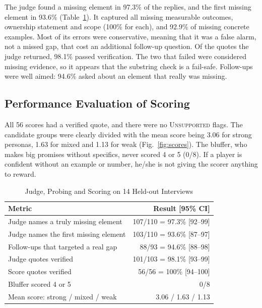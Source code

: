 \documentclass[conference]{IEEEtran}
\begin{document}
The judge found a missing element in 97.3\% of the replies, and the first missing element in 93.6\% (Table~\ref{tab:judge}). It captured all missing measurable outcomes, ownership statement and scope (100\% for each), and 92.9\% of missing concrete examples. Most of its errors were conservative, meaning that it was a false alarm, not a missed gap, that cost an additional follow-up question. Of the quotes the judge returned, 98.1\% passed verification. The two that failed were considered missing evidence, so it appears that the substring check is a fail-safe. Follow-ups were well aimed: 94.6\% asked about an element that really was missing.

\subsection{Performance Evaluation of Scoring}

All 56 scores had a verified quote, and there were no \textsc{Unsupported} flags. The candidate groups were clearly divided with the mean score being 3.06 for strong personas, 1.63 for mixed and 1.13 for weak (Fig.~\ref{fig:scores}). The bluffer, who makes big promises without specifics, never scored 4 or 5 (0/8). If a player is confident without an example or number, he/she is not giving the scorer anything to reward.

\begin{table}[t]
\caption{Judge, Probing and Scoring on 14 Held-out Interviews}
\label{tab:judge}
\centering
\small
\begin{tabularx}{\columnwidth}{@{}X r@{}}
\toprule
\textbf{Metric} & \textbf{Result [95\% CI]} \\
\midrule
Judge names a truly missing element & 107/110 = 97.3\% [92--99] \\
Judge names the first missing element & 103/110 = 93.6\% [87--97] \\
Follow-ups that targeted a real gap & 88/93 = 94.6\% [88--98] \\
Judge quotes verified & 101/103 = 98.1\% [93--99] \\
Score quotes verified & 56/56 = 100\% [94--100] \\
Bluffer scored 4 or 5 & 0/8 \\
Mean score: strong / mixed / weak & 3.06 / 1.63 / 1.13 \\
\bottomrule
\end{tabularx}
\end{table}
\end{document}
